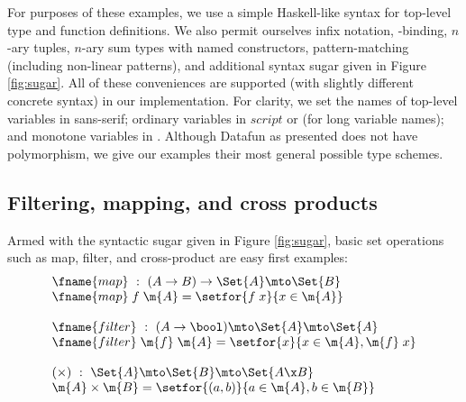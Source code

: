 For purposes of these examples, we use a simple Haskell-like syntax for
top-level type and function definitions. We also permit ourselves infix
notation, -binding, $n$-ary tuples, $n$-ary sum types with named
constructors, pattern-matching (including non-linear patterns), and additional
syntax sugar given in Figure \ref{fig:sugar}. All of these conveniences are
supported (with slightly different concrete syntax) in our implementation.
%
%
For clarity, we set the names of top-level variables in \textsf{sans-serif};
ordinary variables in $script$ or  (for long variable names); and
monotone variables in .
%
Although Datafun as presented does not have polymorphism, we give our examples
their most general possible type schemes.



\subsection{Filtering, mapping, and cross products}

Armed with the syntactic sugar given in Figure \ref{fig:sugar}, basic set
operations such as map, filter, and cross-product are easy first examples:
\[\begin{array}{l}
\fname{map} ~:~ (A \uto B) \uto \Set{A} \mto \Set{B}\\
\fname{map}\;f\;\m{A} = \setfor{f\;x}{x \in \m{A}}\\
\\
\fname{filter} ~:~ (A \uto \bool) \mto \Set{A} \mto \Set{A}\\
\fname{filter}\;\m{f}\;\m{A} = \setfor{x}{x \in \m{A}, \m{f}\; x}\\
\\
(\times) ~:~ \Set{A} \mto \Set{B} \mto \Set{A \x B}\\
\m{A} \times \m{B} = \setfor{(a,b)}{a \in \m{A}, b \in \m{B}}
\end{array}\]

